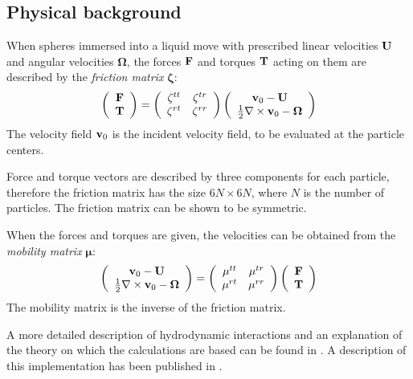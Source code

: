 \documentclass[12pt]{article}
\newcommand{\vect}[1]{{\bf #1}}
\newcommand{\gvect}[1]{\mathbf{#1}}
\newcommand{\gtens}[1]{\mathbf{#1}}
\newcommand{\vv}{\vect{v}}
\newcommand{\vU}{\vect{U}}
\newcommand{\tzeta}{\gtens{\zeta}}
\newcommand{\tmu}{\gtens{\mu}}
\begin{document}
\subsection{Physical background}

When spheres immersed into a liquid move with prescribed linear
velocities $\vect{U}$ and angular velocities $\gvect{\Omega}$, the
forces $\vect{F}$ and torques $\vect{T}$ acting on them are described
by the {\em friction matrix} $\tzeta$:
\[
\left(\begin{array}{c} \vect{F}\\ \vect{T} \end{array}\right) = 
\left(\begin{array}{cc}
\tzeta^{tt} & \tzeta^{tr} \\
\tzeta^{rt} & \tzeta^{rr}
\end{array}\right) \left(\begin{array}{c}
\vv_0-\vU\\ \frac{1}{2}\nabla\times\vv_0-\gvect{\Omega}
\end{array}\right)
\]
The velocity field $\vv_0$ is the incident velocity field, to be
evaluated at the particle centers.

Force and torque vectors are described by three components for each
particle, therefore the friction matrix has the size $6N\times 6N$,
where $N$ is the number of particles. The friction matrix can be shown
to be symmetric.

When the forces and torques are given, the velocities can be obtained
from the
{\em mobility matrix} $\tmu$:
\[
\left(\begin{array}{c}
\vv_0-\vU\\ \frac{1}{2}\nabla\times\vv_0-\gvect{\Omega}
\end{array}\right) = 
\left(\begin{array}{cc}
\tmu^{tt} & \tmu^{tr} \\
\tmu^{rt} & \tmu^{rr}
\end{array}\right) \left(\begin{array}{c}
\vect{F}\\ \vect{T}
\end{array}\right)
\]
The mobility matrix is the inverse of the friction matrix.

A more detailed description of hydrodynamic interactions and an explanation
of the theory on which the calculations are based can be found in
\cite{cifehiwabl}. A description of this implementation has been
published in \cite{hi}.
\end{document}
